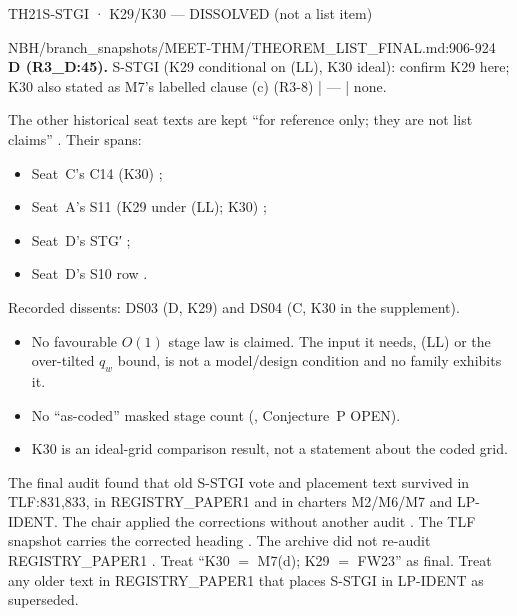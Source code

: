 \begin{card}{TH21}{S-STGI · K29/K30 — DISSOLVED (not a list item)}
\begin{stmt}{NBH/branch_snapshots/MEET-THM/THEOREM_LIST_FINAL.md:906-924}
\textbf{D (R3\_D:45).} S-STGI (K29 conditional on (LL), K30 ideal): confirm K29 here; K30 also stated as M7's labelled clause (c) (R3-8) | — | none.
\end{stmt}
The other historical seat texts are kept ``for reference only; they are not list claims'' . Their spans:
\begin{itemize}
\item Seat~C's C14 (K30) ;
\item Seat~A's S11 (K29 under (LL); K30) ;
\item Seat~D's STG′ ;
\item Seat~D's S10 row .
\end{itemize}
Recorded dissents: DS03 (D, K29) and DS04 (C, K30 in the supplement).

\begin{notproved}
\begin{itemize}
\item No favourable $O(1)$ stage law is claimed. The input it needs, (LL) or the over-tilted $q_w$ bound, is not a model/design condition and no family exhibits it.
\item No ``as-coded'' masked stage count (, Conjecture~P OPEN).
\item K30 is an ideal-grid comparison result, not a statement about the coded grid.
\end{itemize}
\end{notproved}
\begin{uncertain}
The final audit found that old S-STGI vote and placement text survived in TLF:831,833, in REGISTRY\_PAPER1 and in charters M2/M6/M7 and LP-IDENT. The chair applied the corrections without another audit . The TLF snapshot carries the corrected heading . The archive did not re-audit REGISTRY\_PAPER1 . Treat ``K30 $=$ M7(d); K29 $=$ FW23'' as final. Treat any older text in REGISTRY\_PAPER1 that places S-STGI in LP-IDENT as superseded.
\end{uncertain}
\end{card}

